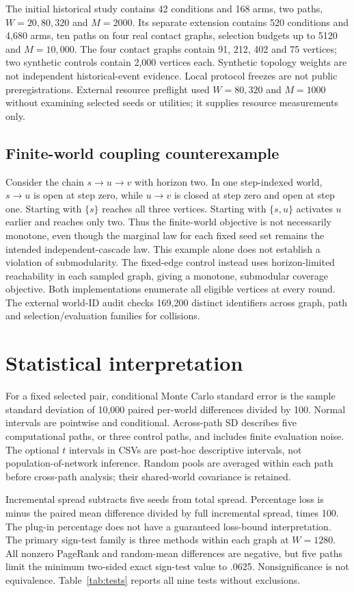 \documentclass[smallextended]{svjour3}
\begin{document}
The initial historical study contains 42 conditions and 168 arms, two paths,
$W=20,80,320$ and $M=2000$. Its separate extension contains 520 conditions and
4,680 arms, ten paths on four real contact graphs, selection budgets up to 5120
and $M=10,000$. The four contact graphs contain 91, 212, 402 and 75 vertices;
two synthetic controls contain 2,000 vertices each. Synthetic topology weights
are not independent historical-event evidence. Local protocol freezes are not
public preregistrations. External resource preflight used $W=80,320$ and
$M=1000$ without examining selected seeds or utilities; it supplies resource
measurements only.

\subsection{Finite-world coupling counterexample}
Consider the chain $s\to u\to v$ with horizon two. In one step-indexed world,
$s\to u$ is open at step zero, while $u\to v$ is closed at step zero and open
at step one. Starting with $\{s\}$ reaches all three vertices. Starting with
$\{s,u\}$ activates $u$ earlier and reaches only two. Thus the finite-world
objective is not necessarily monotone, even though the marginal law for each
fixed seed set remains the intended independent-cascade law. This example alone
does not establish a violation of submodularity. The fixed-edge control instead
uses horizon-limited reachability in each sampled graph, giving a monotone,
submodular coverage objective. Both implementations enumerate all eligible
vertices at every round. The external world-ID audit checks 169,200 distinct
identifiers across graph, path and selection/evaluation families for collisions.

\section{Statistical interpretation}
For a fixed selected pair, conditional Monte Carlo standard error is the sample
standard deviation of 10,000 paired per-world differences divided by 100.
Normal intervals are pointwise and conditional. Across-path SD describes five
computational paths, or three control paths, and includes finite evaluation noise.
The optional $t$ intervals in CSVs are post-hoc descriptive intervals, not
population-of-network inference. Random pools are averaged within each path
before cross-path analysis; their shared-world covariance is retained.

Incremental spread subtracts five seeds from total spread. Percentage loss is
minus the paired mean difference divided by full incremental spread, times 100.
The plug-in percentage does not have a guaranteed loss-bound interpretation.
The primary sign-test family is three methods within each graph at $W=1280$.
All nonzero PageRank and random-mean differences are negative, but five paths
limit the minimum two-sided exact sign-test value to .0625. Nonsignificance is
not equivalence. Table~\ref{tab:tests} reports all nine tests without exclusions.
\end{document}
